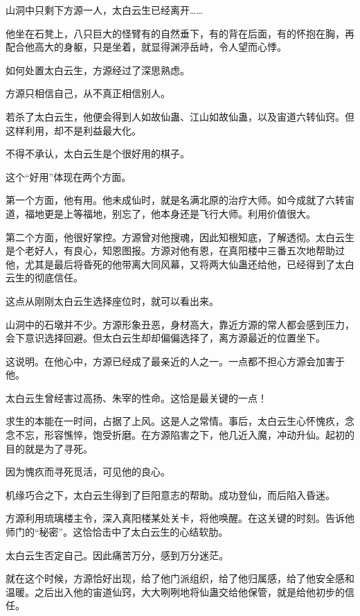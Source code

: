 
\begin{this_body}



山洞中只剩下方源一人，太白云生已经离开……

他坐在石凳上，八只巨大的怪臂有的自然垂下，有的背在后面，有的怀抱在胸，再配合他高大的身躯，只是坐着，就显得渊渟岳峙，令人望而心悸。

如何处置太白云生，方源经过了深思熟虑。

方源只相信自己，从不真正相信别人。

若杀了太白云生，他便会得到人如故仙蛊、江山如故仙蛊，以及宙道六转仙窍。但这样利用，却不是利益最大化。

不得不承认，太白云生是个很好用的棋子。

这个“好用”体现在两个方面。

第一个方面，他有用。他未成仙时，就是名满北原的治疗大师。如今成就了六转宙道，福地更是上等福地，别忘了，他本身还是飞行大师。利用价值很大。

第二个方面，他很好掌控。方源曾对他搜魂，因此知根知底，了解透彻。太白云生是个老好人，有良心，知恩图报。方源对他有恩，在真阳楼中三番五次地帮助过他，尤其是最后将昏死的他带离大同风幕，又将两大仙蛊还给他，已经得到了太白云生的彻底信任。

这点从刚刚太白云生选择座位时，就可以看出来。

山洞中的石墩并不少。方源形象丑恶，身材高大，靠近方源的常人都会感到压力，会下意识选择回避。但太白云生却却偏偏选择了，离方源最近的位置坐下。

这说明。在他心中，方源已经成了最亲近的人之一。一点都不担心方源会加害于他。

太白云生曾经害过高扬、朱宰的性命。这恰是最关键的一点！

求生的本能在一时间，占据了上风。这是人之常情。事后，太白云生心怀愧疚，念念不忘，形容憔悴，饱受折磨。在方源陷害之下，他几近入魔，冲动升仙。起初的目的就是为了寻死。

因为愧疚而寻死觅活，可见他的良心。

机缘巧合之下，太白云生得到了巨阳意志的帮助。成功登仙，而后陷入昏迷。

方源利用琉璃楼主令，深入真阳楼某处关卡，将他唤醒。在这关键的时刻。告诉他师门的“秘密”。这恰恰击中了太白云生的心结软肋。

太白云生否定自己。因此痛苦万分，感到万分迷茫。

就在这个时候，方源恰好出现，给了他门派组织，给了他归属感，给了他安全感和温暖。之后出入他的宙道仙窍，大大咧咧地将仙蛊交给他保管，就是给他初步的信任。


\end{this_body}
